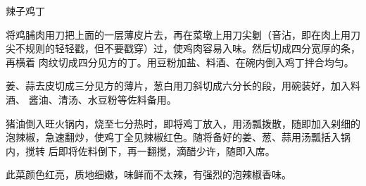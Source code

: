 \begin{recipe}{辣子鸡丁}

\ingredients



\preparation

\step 将鸡脯肉用刀把上面的一层薄皮片去，再在菜墩上用刀尖劖（音沾，即在肉上用刀
尖不规则的轻轻戳，但不要戳穿）过，使鸡肉容易入味。然后切成四分宽厚的条，再横着
肉纹切成四分见方的丁。用豆粉加盐、料酒、在碗内倒入鸡丁拌合均匀。

姜、蒜去皮切成三分见方的薄片，葱白用刀斜切成六分长的段，用碗装好，加入料酒、
酱油、清汤、水豆粉等佐料备用。

\step 猪油倒入旺火锅内，烧至七分热时，即将鸡丁放入，用汤瓢拨散，随即加入剁细的
泡辣椒，急速翻炒，使鸡丁全见辣椒红色。随将备好的姜、葱、蒜用汤瓢括入锅内，搅转
后即将佐料倒下，再一翻搅，滴醋少许，随即入席。

\features

此菜颜色红亮，质地细嫩，味鲜而不太辣，有强烈的泡辣椒香味。

\end{recipe}

